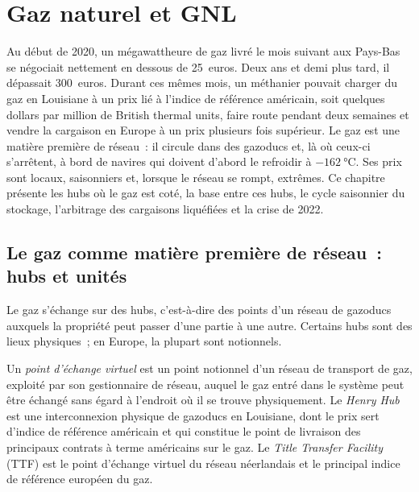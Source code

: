 \chapter{Gaz naturel et GNL}\label{ch:m3:natural-gas-and-lng}

Au début de 2020, un mégawattheure de gaz livré le mois suivant aux Pays-Bas se négociait
nettement en dessous de 25~euros. Deux ans et demi plus tard, il dépassait 300~euros. Durant ces mêmes
mois, un méthanier pouvait charger du gaz en Louisiane à un prix lié à l'indice de référence américain,
soit quelques dollars par million de British thermal units, faire route pendant deux semaines
et vendre la cargaison en Europe à un prix plusieurs fois supérieur. Le gaz est une matière
première de réseau~: il circule dans des gazoducs et, là où ceux-ci s'arrêtent, à bord de
navires qui doivent d'abord le refroidir à $-\qty{162}{\degreeCelsius}$. Ses prix sont locaux, saisonniers
et, lorsque le réseau se rompt, extrêmes. Ce chapitre présente les hubs où le gaz est coté, la base
entre ces hubs, le cycle saisonnier du stockage, l'arbitrage des cargaisons liquéfiées et la crise
de 2022.

\section{Le gaz comme matière première de réseau~: hubs et unités}

Le gaz s'échange sur des hubs, c'est-à-dire des points d'un réseau de gazoducs auxquels la
propriété peut passer d'une partie à une autre. Certains hubs sont des lieux physiques~; en Europe, la plupart sont notionnels.

\begin{definition}\label{def:m3:natural-gas-and-lng:hubs}
Un \emph{point d'échange virtuel} est un point notionnel d'un
réseau de transport de gaz, exploité par son gestionnaire de réseau, auquel le gaz entré dans
le système peut être échangé sans égard à l'endroit où il se trouve physiquement.
Le \emph{Henry Hub} est une interconnexion physique de gazoducs en
Louisiane, dont le prix sert d'indice de référence américain et qui constitue le point de livraison des
principaux contrats à terme américains sur le gaz. Le \emph{Title Transfer Facility} (TTF) est le
point d'échange virtuel du réseau néerlandais et le principal indice de référence européen du gaz.
\end{definition}

